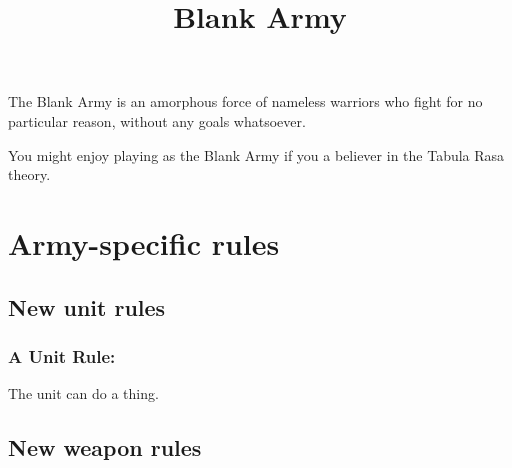 








\title{Blank Army}

\maketitle

The Blank Army is an amorphous force of nameless warriors who fight for no particular reason, without any goals whatsoever.

You might enjoy playing as the Blank Army if you a believer in the Tabula Rasa theory.







\newcommand{\CombatKnife}[1][6+]{\textbf{Combat Knife}: R0 A1 {#1} D0}

\newcommand{\Ram}[1][7+]{\textbf{Ram}: R0 A1 {#1} D4 [Deadly 4]}


\newcommand{\Rifle}[1][6+]{\textbf{Rifle}: R20 A1 {#1} D1}

\newcommand{\TankGun}[1][5+]{\textbf{Tank Gun}: R40 A6 {#1} D5, [Area Effect, Deadly 2]}






\section*{Army-specific rules}


\subsection*{New unit rules}

\subsubsection*{A Unit Rule:} The unit can do a thing.



\subsection*{New weapon rules}

